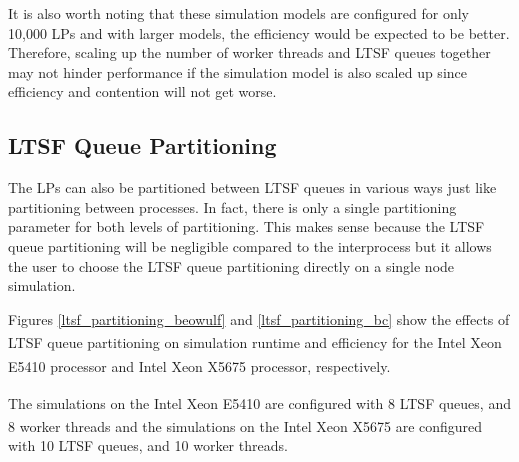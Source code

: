 \documentclass[11pt]{book}
\begin{document}
It is also worth noting that these simulation models are configured for only 10,000 LPs and with
larger models, the efficiency would be expected to be better.  Therefore, scaling up the number
of worker threads and LTSF queues together may not hinder performance if the simulation model
is also scaled up since efficiency and contention will not get worse.  

\subsection{LTSF Queue Partitioning}

The LPs can also be partitioned between LTSF queues in various ways just like partitioning between
processes.  In fact, there is only a single partitioning parameter for both levels of partitioning.
This makes sense because the LTSF queue partitioning will be negligible compared to the interprocess
but it allows the user to choose the LTSF queue partitioning directly on a single node simulation.

Figures \ref{ltsf_partitioning_beowulf} and \ref{ltsf_partitioning_bc} show the effects of LTSF
queue partitioning on simulation runtime and efficiency for the
Intel\textsuperscript{\textregistered} Xeon\textsuperscript{\textregistered} E5410 processor and
Intel\textsuperscript{\textregistered} Xeon\textsuperscript{\textregistered} X5675 processor,
respectively.

The simulations on the Intel\textsuperscript{\textregistered} Xeon\textsuperscript{\textregistered}
E5410 are configured with 8 LTSF queues, and 8 worker threads and the simulations on the 
Intel\textsuperscript{\textregistered} Xeon\textsuperscript{\textregistered} X5675 are configured
with 10 LTSF queues, and 10 worker threads.
\end{document}
